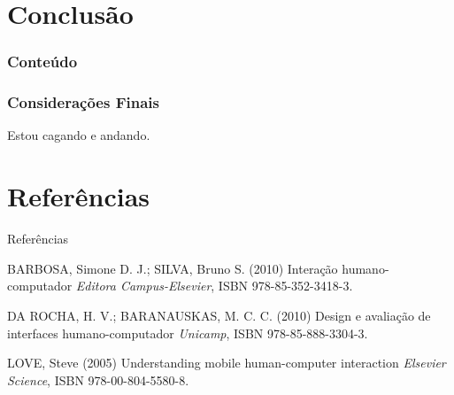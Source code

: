 \documentclass[14pt,beamer]{beamer}
\begin{document}
\section{Conclusão}

\begin{frame}
	\frametitle{Conteúdo}
	\small
\end{frame}

\begin{frame}
	\frametitle{Considerações Finais}

	\begin{block}{}
	Estou cagando e andando.
	\end{block}
\end{frame}


\section*{Referências}

\begin{frame}{Referências}

	\footnotesize{
	\begin{thebibliography}{99}
	\beamertemplatebookbibitems
	 BARBOSA, Simone D. J.; SILVA, Bruno S. (2010)
	\newblock Interação humano-computador
	\newblock \emph{Editora Campus-Elsevier}, ISBN 978-85-352-3418-3.

	 DA ROCHA, H. V.; BARANAUSKAS, M. C. C. (2010)
	\newblock Design e avalia{\c{c}}{\~a}o de interfaces humano-computador
	\newblock \emph{Unicamp}, ISBN 978-85-888-3304-3.
	
	 LOVE, Steve (2005)
	\newblock Understanding mobile human-computer interaction
	\newblock \emph{Elsevier Science}, ISBN 978-00-804-5580-8.
	\end{thebibliography}
	}

\end{frame}

\section*{}
\end{document}
